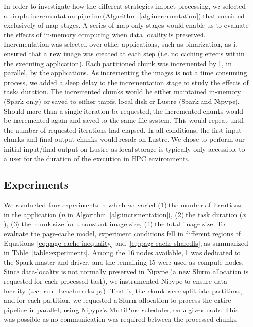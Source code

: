 \documentclass{IEEEtran}
\begin{document}
In order to investigate how the different strategies impact processing, we 
selected a simple incrementation pipeline (Algorithm~\ref{alg:incrementation}) 
that consisted exclusively of map 
stages. A series of map-only stages would enable us to evaluate the effects of
in-memory computing when data locality is preserved. Incrementation was 
selected 
over other applications, such as binarization, as it ensured that a new image
was created at each step (i.e. no caching effects within the executing 
application). Each partitioned chunk was incremented by 1, in parallel, by
the applications. As incrementing the images is not a time consuming process,
we added a sleep delay to the incrementation stage to study the effects 
of tasks duration. The incremented chunks would be either 
maintained in-memory (Spark only) or saved to either tmpfs, local disk or 
Lustre (Spark and Nipype). Should more than a single iteration be requested, 
the incremented chunks would be incremented again and saved to the same file system. 
This would repeat until the number of requested iterations had elapsed. In all 
conditions, the first input chunks and final output chunks would reside on Lustre. 
We chose to perform our initial input/final output on Lustre as local storage is
typically only accessible to a user for the duration of the execution in HPC
environments.

\subsection{Experiments}

We conducted four experiments in which we varied (1) the number of 
iterations in the application ($n$ in 
Algorithm~\ref{alg:incrementation}), (2) the task duration ($x$), (3) 
the chunk size for a constant image size, (4) the total image size. To 
evaluate the page-cache model, experiment conditions fell in different 
regions of Equations~\ref{eq:page-cache-inequality} 
and~\ref{eq:page-cache-sharedfs}, as summarized in 
Table~\ref{table:experiments}. Among the 16 nodes available, 1 was 
dedicated to the Spark master and driver, and the remaining 15 were 
used as compute nodes. Since data-locality is not normally preserved in 
Nipype (a new Slurm allocation is requested for each processed task), 
we instrumented Nipype to ensure data locality (see: \href{https://github.com/big-data-lab-team/paper-in-mem-locality/blob/master/benchmark\_scripts/run\_benchmarks.py}{run\_benchmarks.py}).
That is, the chunk were split into partitions, and for each partition,
we requested a Slurm allocation to process the entire 
pipeline in parallel, using Nipype's MultiProc scheduler, on a given 
node. This was possible as no communication was required between the 
processed chunks.
\end{document}
